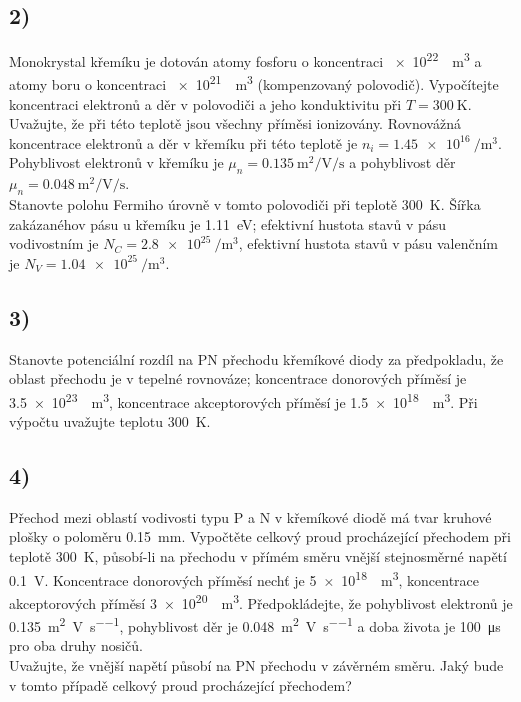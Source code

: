 \newpage


\subsection*{2)}

Monokrystal křemíku je dotován atomy fosforu o koncentraci \SI{e22}{\per\cubic\meter} a atomy boru o koncentraci \SI{e21}{\per\cubic\meter} (kompenzovaný polovodič). Vypočítejte koncentraci elektronů a děr v polovodiči a jeho konduktivitu při $T=\SI{300}{\kelvin}$. Uvažujte, že při této teplotě jsou všechny příměsi ionizovány. Rovnovážná koncentrace elektronů a děr v křemíku při této teplotě je $n_i = \SI{1,45e16}{\per\cubic\meter}$. Pohyblivost elektronů v křemíku je $\mu_n = \SI{0,135}{\meter\squared\per\volt\per\second}$ a pohyblivost děr $\mu_n = \SI{0,048}{\meter\squared\per\volt\per\second}$. \\
Stanovte polohu Fermiho úrovně v tomto polovodiči při teplotě \SI{300}{\kelvin}. Šířka zakázanéhov pásu u křemíku je \SI{1,11}{\electronvolt}; efektivní hustota stavů v pásu vodivostním je $N_C = \SI{2,8e25}{\per\cubic\meter}$, efektivní hustota stavů v pásu valenčním je $N_V = \SI{1,04e25}{\per\cubic\meter}$.

\newpage


\subsection*{3)}

Stanovte potenciální rozdíl na PN přechodu křemíkové diody za předpokladu, že oblast přechodu je v tepelné rovnováze; koncentrace donorových příměsí je \SI{3,5e23}{\per\cubic\meter}, koncentrace akceptorových příměsí je \SI{1,5e18}{\per\cubic\meter}. Při výpočtu uvažujte teplotu \SI{300}{\kelvin}.

\newpage


\subsection*{4)}

Přechod mezi oblastí vodivosti typu P a N v křemíkové diodě má tvar kruhové plošky o poloměru \SI{0,15}{\milli\meter}. Vypočtěte celkový proud procházející přechodem při teplotě \SI{300}{\kelvin}, působí-li na přechodu v přímém směru vnější stejnosměrné napětí \SI{0,1}{\volt}. Koncentrace donorových příměsí nechť je \SI{5e18}{\per\cubic\meter}, koncentrace akceptorových příměsí \SI{3e20}{\per\cubic\meter}. Předpokládejte, že pohyblivost elektronů je \SI{0,135}{\meter\squared\per\volt\per\second}, pohyblivost děr je \SI{0,048}{\meter\squared\per\volt\per\second} a doba života je \SI{100}{\micro\second} pro oba druhy nosičů. \\
Uvažujte, že vnější napětí působí na PN přechodu v závěrném směru. Jaký bude v tomto případě celkový proud procházející přechodem?

